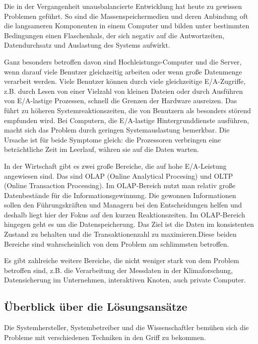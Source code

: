 Die in der Vergangenheit unausbalancierte Entwicklung hat heute zu gewissen Problemen geführt.
So sind die Massenspeichermedien und deren Anbindung oft die langsameren Komponenten in einem Computer und bilden unter bestimmten Bedingungen einen Flaschenhals, der sich negativ auf die Antwortzeiten, Datendurchsatz und Auslastung des Systems aufwirkt. 

Ganz besonders betroffen davon sind Hochleistungs-Computer und die Server, wenn darauf viele Benutzer gleichzeitig arbeiten oder wenn große Datenmenge verarbeit werden. Viele Benutzer können durch viele gleichzeitige E/A-Zugriffe, z.B. durch Lesen von einer Vielzahl von kleinen Dateien oder durch Ausführen von E/A-lastige Prozessen, schnell die Grenzen der Hardware ausreizen. Das führt zu höheren Systemreaktionszeiten, die von Benutzern als besonders störend empfunden wird. Bei Computern, die E/A-lastige Hintergrunddienste ausführen, macht sich das Problem durch geringen Systemauslastung bemerkbar. Die Ursache ist für beide Symptome gleich: die Prozessoren verbringen eine beträchtliche Zeit im Leerlauf, währen sie auf die Daten warten. 

In der Wirtschaft gibt es zwei große Bereiche, die auf hohe E/A-Leistung angewiesen sind. Das sind OLAP (Online Analytical Procesing) und OLTP (Online Transaction Processing). Im OLAP-Bereich nutzt man relativ große Datenbestände für die Informationsgewinnung. Die gewonnen Informationen sollen den Führungskräften und Managern bei den Entscheidungen helfen und deshalb liegt hier der Fokus auf den kurzen Reaktionszeiten. Im OLAP-Bereich hingegen geht es um die Datenspeicherung. Das Ziel ist die Daten im konsistenten Zustand zu behalten und die Transaktionenzahl zu maximieren.Diese beiden Bereiche sind wahrscheinlich von dem Problem am schlimmsten betroffen.

Es gibt zahlreiche weitere Bereiche, die nicht weniger stark von dem Problem betroffen sind, z.B. die Verarbeitung der Messdaten in der Klimaforschung, Datensicherung im Unternehmen, interaktiven Knoten, auch private Computer.

\subsection{Überblick über die Lösungsansätze}
Die Systemhersteller, Systembetreiber und die Wissenschaftler bemühen sich die Probleme mit verschiedenen Techniken in den Griff zu bekommen. 

